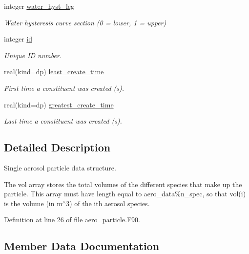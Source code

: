 \begin{DoxyCompactItemize}
integer \mbox{\hyperlink{structpmc__aero__particle_1_1aero__particle__t_a95f85fb461c5c57ef5d15cf6dc09153d}{water\+\_\+hyst\+\_\+leg}}
\begin{DoxyCompactList}\small\item\em Water hysteresis curve section (0 = lower, 1 = upper) \end{DoxyCompactList}\item 
integer \mbox{\hyperlink{structpmc__aero__particle_1_1aero__particle__t_abaa5e67cf0596f0dbd2c003c8d0705e2}{id}}
\begin{DoxyCompactList}\small\item\em Unique ID number. \end{DoxyCompactList}\item 
real(kind=dp) \mbox{\hyperlink{structpmc__aero__particle_1_1aero__particle__t_a252e7c039823818c65a589e3bf5aebde}{least\+\_\+create\+\_\+time}}
\begin{DoxyCompactList}\small\item\em First time a constituent was created (s). \end{DoxyCompactList}\item 
real(kind=dp) \mbox{\hyperlink{structpmc__aero__particle_1_1aero__particle__t_abc4e6e338623e987fe28881f4eb64f54}{greatest\+\_\+create\+\_\+time}}
\begin{DoxyCompactList}\small\item\em Last time a constituent was created (s). \end{DoxyCompactList}\end{DoxyCompactItemize}


\subsection{Detailed Description}
Single aerosol particle data structure. 

The {\ttfamily vol} array stores the total volumes of the different species that make up the particle. This array must have length equal to aero\+\_\+data\%n\+\_\+spec, so that {\ttfamily vol(i)} is the volume (in m$^\wedge$3) of the i\textquotesingle{}th aerosol species. 

Definition at line 26 of file aero\+\_\+particle.\+F90.



\subsection{Member Data Documentation}
\mbox{\label{structpmc__aero__particle_1_1aero__particle__t_ac966076749f2d89847d225244dd83d7e}} 
